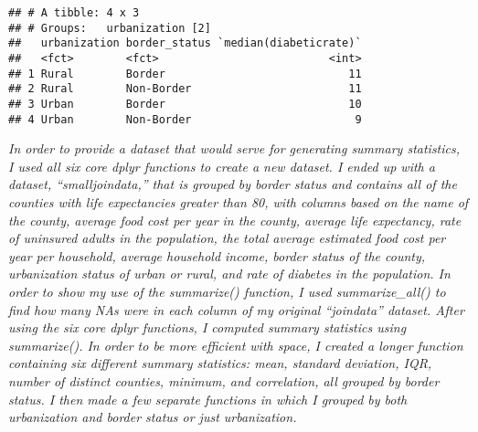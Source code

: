 \documentclass[]{article}
\begin{document}
\begin{verbatim}
## # A tibble: 4 x 3
## # Groups:   urbanization [2]
##   urbanization border_status `median(diabeticrate)`
##   <fct>        <fct>                          <int>
## 1 Rural        Border                            11
## 2 Rural        Non-Border                        11
## 3 Urban        Border                            10
## 4 Urban        Non-Border                         9
\end{verbatim}

\emph{In order to provide a dataset that would serve for generating
summary statistics, I used all six core dplyr functions to create a new
dataset. I ended up with a dataset, ``smalljoindata,'' that is grouped
by border status and contains all of the counties with life expectancies
greater than 80, with columns based on the name of the county, average
food cost per year in the county, average life expectancy, rate of
uninsured adults in the population, the total average estimated food
cost per year per household, average household income, border status of
the county, urbanization status of urban or rural, and rate of diabetes
in the population. In order to show my use of the summarize() function,
I used summarize\_all() to find how many NAs were in each column of my
original ``joindata'' dataset. After using the six core dplyr functions,
I computed summary statistics using summarize(). In order to be more
efficient with space, I created a longer function containing six
different summary statistics: mean, standard deviation, IQR, number of
distinct counties, minimum, and correlation, all grouped by border
status. I then made a few separate functions in which I grouped by both
urbanization and border status or just urbanization.}
\end{document}
